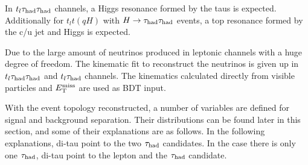 


In $t_l\tau_\text{had}{}\tau_\text{had}$ channels, a Higgs resonance formed by the taus is expected. Additionally for $t_lt(qH)$ with $H\to \tau_\text{had}{}\tau_\text{had}$ events, a top resonance formed by the c/u jet and Higgs is expected.

Due to the large amount of neutrinos produced in leptonic channels with a huge degree of freedom. The kinematic fit to reconstruct the neutrinos is given up in $t_l\tau_\text{had}{}\tau_\text{had}$ and $t_l\tau_\text{had}$ channels. The kinematics calculated directly from visible particles and $E_{\text{T}}^{\text{miss}}$ are used as BDT input.

With the event topology reconstructed, a number of variables are defined for signal and background separation. Their distributions can be found later in this section, and some of their explanations are as follows. In the following explanations, di-tau point to the two $\tau_\text{had}$ candidates.  In the case there is only one $\tau_\text{had}$, di-tau point to the lepton and the $\tau_\text{had}$ candidate.

